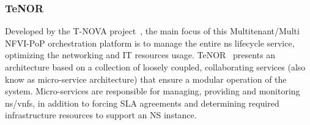 



 


\subsubsection{TeNOR}
Developed by the T-NOVA project~\cite{FP7projectT-NOVAT-NOVAInfrastructures}, the main focus of this Multitenant/Multi NFVI-PoP orchestration platform is to manage the entire \gls{ns} lifecycle service, optimizing the networking and IT resources usage. TeNOR~\cite{7502419} presents an architecture based on a collection of loosely coupled, collaborating services (also know as micro-service architecture) that ensure a modular operation of the system. Micro-services are responsible for managing, providing and monitoring \gls{ns}/\glspl{vnf}, in addition to forcing SLA agreements and determining required infrastructure resources to support an NS instance. 

